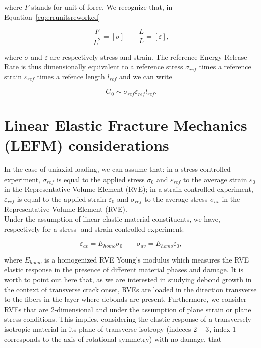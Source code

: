 \documentclass[a4paper,fleqn]{cas-dc}
\begin{document}
where $F$ stands for unit of force. We recognize that, in Equation~\ref{eq:errunitsreworked}

\begin{equation}\label{eq:sigmaepsunits}
\frac{F}{L^{2}}=\left[\sigma\right]\qquad\frac{L}{L}=\left[\varepsilon\right],
\end{equation}

where $\sigma$ and $\varepsilon$ are respectively stress and strain. The reference Energy Release Rate is thus dimensionally equivalent to a reference stress $\sigma_{ref}$ times a reference strain $\varepsilon_{ref}$ times a refence length $l_{ref}$ and we can write

\begin{equation}\label{eq:G}
G_{0}\sim\sigma_{ref}\varepsilon_{ref}l_{ref}.
\end{equation}

\section{Linear Elastic Fracture Mechanics (LEFM) considerations}

In the case of uniaxial loading, we can assume that: in a stress-controlled experiment, $\sigma_{ref}$ is equal to the applied stress $\sigma_{0}$ and $\varepsilon_{ref}$ to the average strain $\varepsilon_{0}$ in the Representative Volume Element (RVE); in a strain-controlled experiment, $\varepsilon_{ref}$ is equal to the applied strain $\varepsilon_{0}$ and $\sigma_{ref}$ to the average stress $\sigma_{av}$ in the Representative Volume Element (RVE).\\
Under the assumption of linear elastic material constituents, we have, respectively for a stress- and strain-controlled experiment:

\begin{equation}\label{eq:elasticresponse}
\varepsilon_{av}=E_{homo}\sigma_{0}\qquad\sigma_{av}=E_{homo}\varepsilon_{0},
\end{equation}

where $E_{homo}$ is a homogenized RVE Young's modulus which measures the RVE elastic response in the presence of different material phases and damage. It is worth to point out here that, as we are interested in studying debond growth in the context of transverse crack onset, RVEs are loaded in the direction transverse to the fibers in the layer where debonds are present. Furthermore, we consider RVEs that are 2-dimensional and under the assumption of plane strain or plane stress conditions. This implies, considering the elastic response of a transversely isotropic material in its plane of transverse isotropy (indeces $2-3$, index $1$ corresponds to the axis of rotational symmetry) with no damage, that~\cite{Timoshenko1987,Mantic2009}
\end{document}
